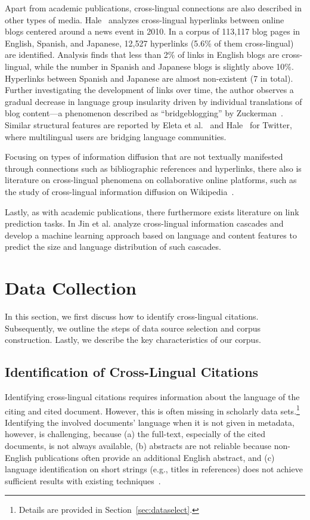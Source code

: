 Apart from academic publications, cross-lingual connections are also described in other types of media. Hale~\cite{Hale2012} analyzes cross-lingual hyperlinks between online blogs centered around a news event in 2010. In a corpus of 113,117 blog pages in English, Spanish, and Japanese, 12,527 hyperlinks (5.6\% of them cross-lingual) are identified. Analysis finds that less than 2\% of links in English blogs are cross-lingual, while the number in Spanish and Japanese blogs is slightly above 10\%. Hyperlinks between Spanish and Japanese are almost non-existent (7 in total). Further investigating the development of links over time, the author observes a gradual decrease in language group insularity driven by individual translations of blog content---a phenomenon described as ``bridgeblogging'' by Zuckerman~\cite{Zuckerman2008}.
Similar structural features are reported by Eleta et al.~\cite{Eleta2012} and Hale~\cite{Hale2014a} for Twitter, where multilingual users are bridging language communities.

Focusing on types of information diffusion that are not textually manifested through connections such as bibliographic references and hyperlinks, there also is literature on cross-lingual phenomena on collaborative online platforms, such as the study of cross-lingual information diffusion on Wikipedia~\cite{Kim2016,Samoilenko2016}.

Lastly, as with academic publications, there furthermore exists literature on link prediction tasks. In \cite{Jin2017} Jin et al. analyze cross-lingual information cascades and develop a machine learning approach based on language and content features to predict the size and language distribution of such cascades.

\section{Data Collection}\label{sec:datacollection}

In this section, we first discuss how to identify cross-lingual citations. Subsequently, we outline the steps of data source selection and corpus construction. Lastly, we describe the key characteristics of our corpus.

\subsection{Identification of Cross-Lingual Citations}
\label{sec:ident}
Identifying cross-lingual citations requires information about the language of the citing and cited document. However, this is often missing in scholarly data sets.\footnote{Details are provided in Section~\ref{sec:dataselect}.} Identifying the involved documents' language when it is not given in metadata, however, is challenging, because (a) the full-text, especially of the cited documents, is not always available, (b) abstracts are not reliable because non-English publications often provide an additional English abstract, and (c) language identification on short strings (e.g., titles in references) does not achieve sufficient results with existing techniques~\cite{Jauhiainen2019}.

